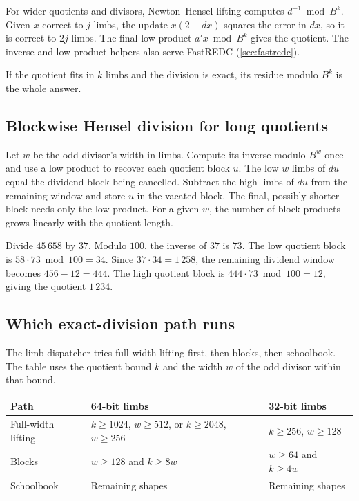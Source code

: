 For wider quotients and divisors, Newton--Hensel lifting computes
$d^{-1}\bmod B^k$. Given $x$ correct to $j$ limbs, the update
$x(2-dx)$ squares the error in $dx$, so it is correct to $2j$ limbs.
The final low product $a'x\bmod B^k$ gives the quotient. The inverse
and low-product helpers also serve FastREDC (\cref{sec:fastredc}).

\begin{keyidea}
If the quotient fits in $k$ limbs and the division is exact, its
residue modulo $B^k$ is the whole answer.
\end{keyidea}

\newpage
\subsection{Blockwise Hensel division for long quotients}

Let $w$ be the odd divisor's width in limbs. Compute its inverse
modulo $B^w$ once and use a low product to recover each quotient
block $u$. The low $w$ limbs of $du$ equal the dividend block being
cancelled. Subtract the high limbs of $du$ from the remaining window
and store $u$ in the vacated block. The final, possibly shorter
block needs only the low product. For a given $w$, the number of
block products grows linearly with the quotient length.

\begin{example}
Divide $45\,658$ by $37$. Modulo $100$, the inverse of $37$ is $73$.
The low quotient block is $58\cdot73\bmod100=34$.
Since $37\cdot34=1\,258$, the remaining dividend window becomes
$456-12=444$. The high quotient block is $444\cdot73\bmod100=12$,
giving the quotient $1\,234$.
\end{example}

\subsection{Which exact-division path runs}

The limb dispatcher tries full-width lifting first, then blocks, then
schoolbook. The table uses the quotient bound $k$ and the width $w$
of the odd divisor within that bound.

\begin{center}
\small
\begin{tabularx}{\textwidth}{@{}lXX@{}}
\toprule
Path & 64-bit limbs & 32-bit limbs \\
\midrule
Full-width lifting & $k \ge 1024$, $w \ge 512$, or $k \ge 2048$, $w \ge 256$
                   & $k \ge 256$, $w \ge 128$ \\
Blocks & $w \ge 128$ and $k \ge 8w$ & $w \ge 64$ and $k \ge 4w$ \\
Schoolbook & Remaining shapes & Remaining shapes \\
\bottomrule
\end{tabularx}
\end{center}

